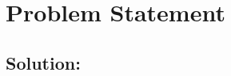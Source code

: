 \documentclass[a4paper,12pt]{article}
\begin{document}
\fontsize{15}{18}\selectfont

\section*{Problem Statement}

\bigskip

\subsection*{Solution:}
\end{document}
